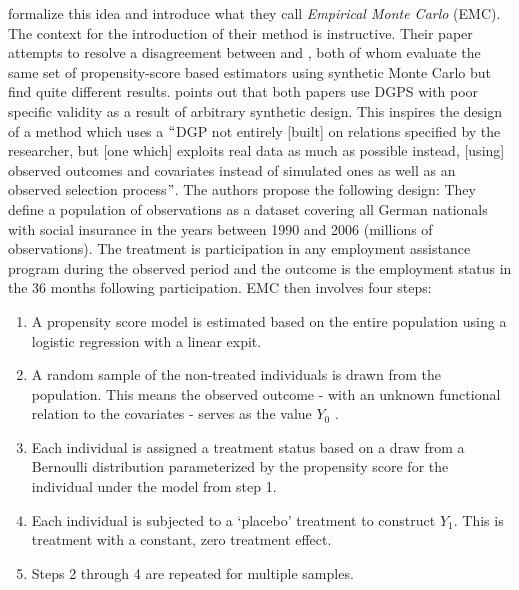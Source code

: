 \documentclass[../main.tex]{subfiles}
\begin{document}
\vspace{\baselineskip}
\textcite{Huber2013TheScore} formalize this idea and introduce what they call \textit{Empirical Monte Carlo }(EMC). The context for the introduction of their method is instructive. Their paper attempts to resolve a disagreement between \textcite{Frolich2004Finite-sampleEstimators} and \textcite{Busso2014NewEstimators}, both of whom evaluate the same set of propensity-score based estimators using synthetic Monte Carlo but find quite different results. \textcite{Huber2013TheScore} points out that both papers use DGPS with poor specific validity as a result of arbitrary synthetic design. This inspires the design of a method which uses a $``$DGP not entirely [built] on relations specified by the researcher, but [one which] exploits real data as much as possible instead, [using] observed outcomes and covariates instead of simulated ones as well as an observed selection process$"$. The authors propose the following design: They define a population of observations as a dataset covering all German nationals with social insurance in the years between 1990 and 2006 (millions of observations). The treatment is participation in any employment assistance program during the observed period and the outcome is the employment status in the 36 months following participation. EMC then involves four steps: \par


\vspace{\baselineskip}
\begin{enumerate}
    \item A propensity score model is estimated based on the entire population using a logistic regression with a linear expit.\par

    \item A random sample of the non-treated individuals is drawn from the population. This means the observed outcome - with an unknown functional relation to the covariates - serves as the value  \( Y_{0} \) .\par

    \item Each individual is assigned a treatment status based on a draw from a Bernoulli distribution parameterized by the propensity score for the individual under the model from step 1.\par

    \item Each individual is subjected to a ‘placebo’ treatment to construct  \( Y_{1}. \) This is treatment with a constant, zero treatment effect.\par

    \item Steps 2 through 4 are repeated for multiple samples.
\end{enumerate}\par
\end{document}
